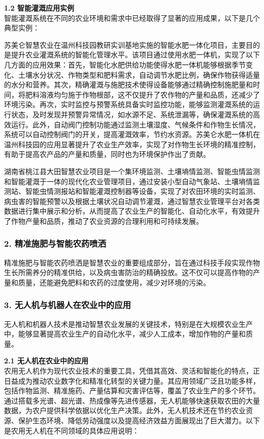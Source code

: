 \textbf{1.2 智能灌溉应用实例} \\
智能灌溉系统在不同的农业环境和需求中已经取得了显著的应用成果，以下是几个典型实例：

苏美仑智慧农业在温州科技园教研实训基地实施的智能水肥一体化项目，主要目的是提升农业灌溉系统的智能化管理水平。该项目通过使用水肥一体机，实现了以下几方面的应用效果：首先，智能化水肥供给功能使得水肥一体机能够根据季节变化、土壤水分状况、作物类型和肥料需求，自动调节水肥比例，确保作物获得适量的水分和营养。其次，精确灌溉与施肥技术使得设备能够通过精确控制施肥量和时间，将肥料溶液均匀施于作物根部，这不仅提升了农作物的产量和品质，还减少了环境污染。再次，实时监控与预警系统具备实时监控功能，能够监测灌溉系统的运行状态，及时发现并预警异常情况，如水源不足、系统泄漏等，确保灌溉系统的高效运行。此外，自动阀门控制功能通过监测土壤湿度、气候条件和作物生长情况，系统可以自动控制阀门的开关，提高灌溉效率，节约水资源。苏美仑水肥一体机在温州科技园的应用显著提升了农业生产效率，实现了对作物生长环境的精准控制，有助于提高农产品的产量和质量，同时也为环境保护作出了贡献。

湖南省桃江县大田智慧农业项目是一个集环境监测、土壤墒情监测、智能虫情监测和智能灌溉于一体的现代化农业管理项目，通过安装小型自动气象站、土壤墒情监测站、智能虫情测报站和智能灌溉控制器等设备，实现了对农田环境的实时监测、病虫害的智能预警以及根据土壤状况自动调节灌溉，通过智慧农业管理平台对各类数据进行集中展示和分析，从而提高了农业生产的智能化、自动化水平，有效提升了作物产量和品质，推动了农业资源的合理利用和可持续发展。
\subsubsection{2. 精准施肥与智能农药喷洒}

精准施肥与智能农药喷洒是智慧农业的重要组成部分，旨在通过科技手段实现作物生长所需养分的精准供给，以及病虫害防治的精确投放。这不仅可以提高作物的产量和质量，还能避免肥料和农药的过度使用，减少对环境的污染。



\subsubsection{3. 无人机与机器人在农业中的应用}

无人机和机器人技术是推动智慧农业发展的关键技术，特别是在大规模农业生产中，能够显著提高农业生产的自动化水平，减少人工成本，增加作物的产量和质量。

\textbf{2.1 无人机在农业中的应用} \\
农用无人机作为现代农业技术的重要工具，凭借其高效、灵活和智能化的特点，正日益成为推动农业数字化和精准化转型的关键力量。其应用领域广泛且功能多样，包括作物监测、精准施药、产量估算和灾害评估等，覆盖了农业生产的多个环节。通过搭载多光谱、超光谱、热成像等先进传感器，无人机能够快速获取农田的大量数据，为农户提供科学依据以优化生产决策。此外，无人机技术还在节约农业资源、保护生态环境、降低劳动强度以及提高经济效益方面展现出了巨大潜力。以下是农用无人机在不同领域的具体应用说明：

